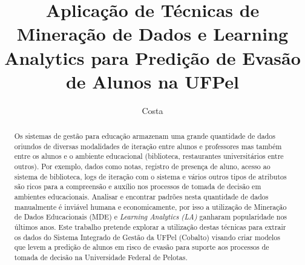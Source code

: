 \documentclass[diss-proposta,nocipinfo]{texufpel}
\title{Aplicação de Técnicas de Mineração de Dados e Learning Analytics para Predição de Evasão de Alunos na UFPel}
\author{Costa}{Alexandre Gomes da}
\begin{document}
\maketitle 
\sloppy

\begin{abstract}
Os sistemas de gestão para educação armazenam uma grande quantidade de dados oriundos de diversas modalidades de iteração entre alunos e professores mas também entre os alunos e o ambiente educacional (biblioteca, restaurantes universitários entre outros). Por exemplo, dados como notas, registro de presença de aluno, acesso ao sistema de biblioteca, logs de iteração com o sistema e vários outros tipos de atributos são ricos para a compreensão e auxílio nos processos de tomada de decisão em ambientes educacionais. Analisar e encontrar padrões nesta quantidade de dados manualmente é inviável humana e economicamente, por isso a utilização de Mineração de Dados Educacionais (MDE) e \textit{Learning Analytics (LA)} ganharam popularidade nos últimos anos. Este trabalho pretende explorar a utilização destas técnicas para extrair os dados do Sistema Integrado de Gestão da UFPel (Cobalto) visando criar modelos que levem a predição de alunos em risco de evasão para suporte aos processos de tomada de decisão na Universidade Federal de Pelotas. 



\end{abstract}
\end{document}

